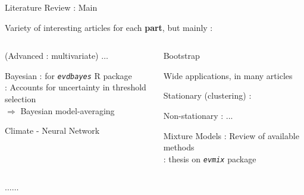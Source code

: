 \documentclass[9pt,xcolor={dvipsnames}]{beamer}
\begin{document}
\begin{frame}{ Literature Review : Main }

Variety of interesting articles for each \textbf{part}, but mainly : 
\vspace{.3cm}
\begin{columns}
\begin{column}{.5\textwidth}

\begin{block}{(Advanced : multivariate)}
	\vspace{.1cm}
\centering	$\dots$ \vspace{.1cm}
	\end{block}

\begin{block}{Bayesian}
		\textcolor{JungleGreen}{\cite{stephenson_users_2006}} : for \texttt{\emph{evdbayes}} R package  \\
		\textcolor{JungleGreen}{\cite{northrop_cross-validatory_2017}} : Accounts for uncertainty in threshold selection \\ $\Rightarrow$ Bayesian model-averaging
\end{block}

\begin{block}{Climate - Neural Network}
 \textcolor{JungleGreen}{\cite{Galiatsatou_modeling_2016}} \\
  \textcolor{JungleGreen}{\cite{cannon_flexible_2010}}
\end{block}

\end{column}

\begin{column}{.5\textwidth}

\begin{block}{Bootstrap}
	
Wide applications, in many articles
\end{block}

\begin{block}{Stationary (clustering)}
	\textcolor{JungleGreen}{\cite{ferro_inference_2003}} :
\end{block}

\begin{block}{Non-stationary}
\textcolor{JungleGreen}{\cite{cheng_non-stationary_2014}} :
...
\end{block}

\begin{block}{Mixture Models}
	\textcolor{JungleGreen}{\cite{scarrott_review_2012}} : Review of available methods \\
	\textcolor{JungleGreen}{\cite{hu_extreme_2013}} : thesis on \texttt{\emph{evmix}} package
\end{block}

\end{column}

\end{columns}
\vspace{.5cm}
\centering $\dots \dots$ 
\end{frame}
\end{document}
